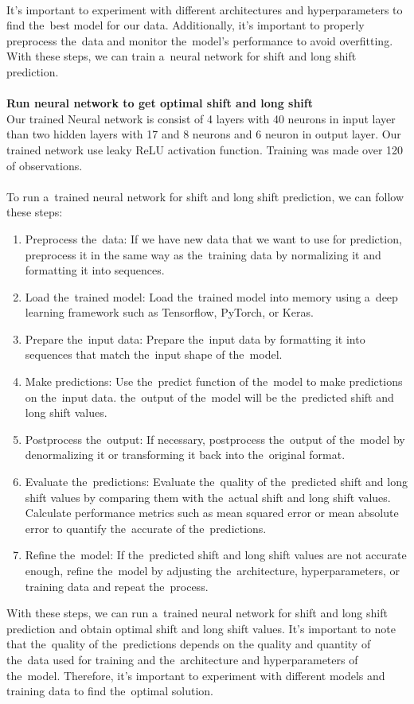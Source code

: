         \\
        It's important to experiment with different architectures and hyperparameters to find the~best model for
        our data. Additionally, it's important to properly preprocess the~data and monitor the~model's performance
        to avoid overfitting. With these steps, we can train a~neural network for shift and long shift prediction.\\
        \\
        \textbf{Run neural network to get optimal shift and long shift}\\
        Our trained Neural network is consist of 4 layers with 40 neurons in input layer than two hidden layers with 17 and 8 neurons and 6 neuron in output layer. Our trained network use leaky ReLU activation function. Training was made over 120 of observations.\\
        \\
        To run a~trained neural network for shift and long shift prediction, we can follow these steps:
        \begin{enumerate}
            \item Preprocess the~data: If we have new data that we want to use for prediction, preprocess it in the
            same way as the~training data by normalizing it and formatting it into sequences.
            \item Load the~trained model: Load the~trained model into memory using a~deep learning framework such as
            Tensorflow, PyTorch, or Keras.
            \item Prepare the~input data: Prepare the~input data by formatting it into sequences that match the~input
            shape of the~model.
            \item Make predictions: Use the~predict function of the~model to make predictions on the~input data.
            the~output of the~model will be the~predicted shift and long shift values.
            \item Postprocess the~output: If necessary, postprocess the~output of the~model by denormalizing it or
            transforming it back into the~original format.
            \item Evaluate the~predictions: Evaluate the~quality of the~predicted shift and long shift values by
            comparing them with the~actual shift and long shift values. Calculate performance metrics such as mean
            squared error or mean absolute error to quantify the~accurate of the~predictions.
            \item Refine the~model: If the~predicted shift and long shift values are not accurate enough,
            refine the~model by adjusting the~architecture, hyperparameters, or training data and repeat the~process.
        \end{enumerate}
        With these steps, we can run a~trained neural network for shift and long shift prediction and obtain optimal
        shift and long shift values. It's important to note that the~quality of the~predictions depends on the
        quality and quantity of the~data used for training and the~architecture and hyperparameters of the~model.
        Therefore, it's important to experiment with different models and training data to find the~optimal solution.
